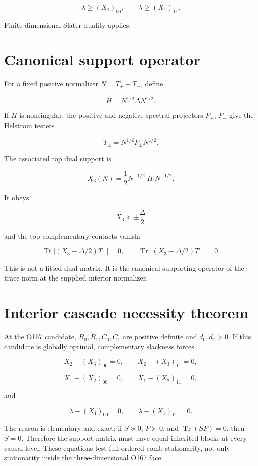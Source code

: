 \documentclass[11pt,a4paper,openany]{report}
\begin{document}
\[
\lambda\ge(X_1)_{00},\qquad
\lambda\ge(X_1)_{11}.
\]

Finite-dimensional Slater duality applies.

\section{Canonical support operator}

For a fixed positive normalizer \(N=T_++T_-\), define

\[
H=N^{1/2}\Delta N^{1/2}.
\]

If \(H\) is nonsingular, the positive and negative spectral projectors \(P_+\), \(P_-\) give the Helstrom testers

\[
T_\pm=N^{1/2}P_\pm N^{1/2}.
\]

The associated top dual support is

\[
\boxed{
X_3(N)=\frac12N^{-1/2}|H|N^{-1/2}.}
\]

It obeys

\[
X_3\succeq\pm\frac\Delta2
\]

and the top complementary contacts vanish:

\[
\operatorname{Tr}\!\bigl[
(X_3-\Delta/2)T_+\bigr]=0,
\qquad
\operatorname{Tr}\!\bigl[
(X_3+\Delta/2)T_-\bigr]=0.
\]

This is not a fitted dual matrix. It is the canonical supporting operator of the trace norm at the supplied interior normalizer.

\section{Interior cascade necessity theorem}

At the O167 candidate, \(B_0,B_1,C_0,C_1\) are positive definite and \(d_0,d_1>0\). If this candidate is globally optimal, complementary slackness forces

\[
X_2-(X_3)_{00}=0,
\qquad
X_2-(X_3)_{11}=0,
\]

\[
X_1-(X_2)_{00}=0,
\qquad
X_1-(X_2)_{11}=0,
\]

and

\[
\lambda-(X_1)_{00}=0,
\qquad
\lambda-(X_1)_{11}=0.
\]

The reason is elementary and exact: if \(S\succeq0\), \(P\succ0\), and \(\operatorname{Tr}(SP)=0\), then \(S=0\). Therefore the support matrix must have equal inherited blocks at every causal level. These equations test full ordered-comb stationarity, not only stationarity inside the three-dimensional O167 face.
\end{document}
